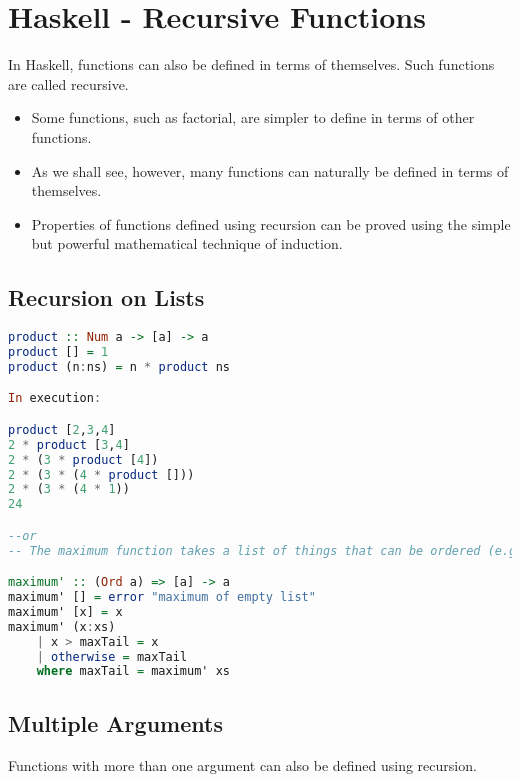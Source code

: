 \hypertarget{haskell}{%
\section{Haskell - Recursive Functions}\label{haskell}}

In Haskell, functions can also be defined in terms of themselves. Such
functions are called recursive.

\begin{itemize}
\tightlist
\item
  Some functions, such as factorial, are simpler to define in terms of
  other functions.
\item
  As we shall see, however, many functions can naturally be defined in
  terms of themselves.
\item
  Properties of functions defined using recursion can be proved using
  the simple but powerful mathematical technique of induction.
\end{itemize}

\hypertarget{recursion-on-lists}{%
\subsection{Recursion on Lists}\label{recursion-on-lists}}

\begin{lstlisting}[language=Haskell]
product :: Num a -> [a] -> a
product [] = 1
product (n:ns) = n * product ns

In execution:

product [2,3,4]
2 * product [3,4]
2 * (3 * product [4])
2 * (3 * (4 * product []))
2 * (3 * (4 * 1))
24

--or
-- The maximum function takes a list of things that can be ordered (e.g. instances of the Ord typeclass) and returns the biggest of them.

maximum' :: (Ord a) => [a] -> a  
maximum' [] = error "maximum of empty list"  
maximum' [x] = x  
maximum' (x:xs)   
    | x > maxTail = x  
    | otherwise = maxTail  
    where maxTail = maximum' xs
\end{lstlisting}

\hypertarget{multiple-arguments}{%
\subsection{Multiple Arguments}\label{multiple-arguments}}

Functions with more than one argument can also be defined using
recursion.

